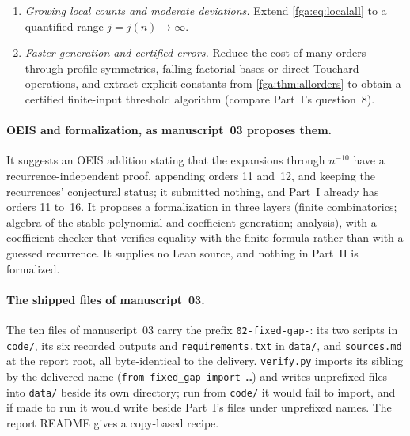\documentclass[11pt]{article}
\numberwithin{equation}{section}
\theoremstyle{definition}
\theoremstyle{remark}
\theoremstyle{definition}
\begin{document}
\begin{enumerate}
components containing cycles; a first target is two pairs sharing one gap.
[Added 5 October 2026, batch 101: answered by Part~VII for the reciprocal
pair $(r,s)$, $(s,r)$ of absolute gaps: joint law, interacting colours and
components with cycles (\cref{spf:cg:thm:main,spf:cg:rem:cycles}). Two pairs
sharing one gap, the first target named here, remains open.]
\item \emph{Growing local counts and moderate deviations.} Extend
\eqref{fga:eq:localall} to a quantified range $j=j(n)\to\infty$.
\item \emph{Faster generation and certified errors.} Reduce the cost of
many orders through profile symmetries, falling-factorial bases or direct
Touchard operations, and extract explicit constants from
\cref{fga:thm:allorders} to obtain a certified finite-input threshold
algorithm (compare Part~I's question~8).
\end{enumerate}

\paragraph{OEIS and formalization, as manuscript~03 proposes them.} It
suggests an OEIS addition stating that the expansions through $n^{-10}$
have a recurrence-independent proof, appending orders 11 and~12, and
keeping the recurrences' conjectural status; it submitted nothing, and
Part~I already has orders 11 to~16. It proposes a formalization in three
layers (finite combinatorics; algebra of the stable polynomial and
coefficient generation; analysis), with a coefficient checker that
verifies equality with the finite formula rather than with a guessed
recurrence. It supplies no Lean source, and nothing in Part~II is
formalized.

\paragraph{The shipped files of manuscript~03.}
The ten files of manuscript~03 carry the prefix \texttt{02-fixed-gap-}:
its two scripts in \texttt{code/}, its six recorded outputs and
\texttt{requirements.txt} in \texttt{data/}, and \texttt{sources.md} at the
report root, all byte-identical to the delivery. \texttt{verify.py}
imports its sibling by the delivered name (\texttt{from fixed\_gap import
\ldots}) and writes unprefixed files into \texttt{data/} beside its own
directory; run from \texttt{code/} it would fail to import, and if made to
run it would write beside Part~I's files under unprefixed names. The report
README gives a copy-based recipe.
\end{document}
